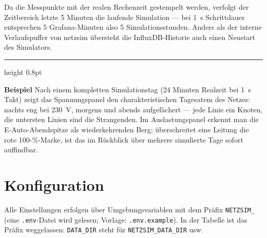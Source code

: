 \documentclass[11pt,a4paper,parskip=half]{scrreprt}
\newenvironment{beispiel}[1][Beispiel]
  {\par\medskip
   {\color{bsp}\hrule height 0.8pt}\nopagebreak\smallskip
   \noindent\textbf{\textsf{\textcolor{bsp}{#1}}}\quad\ignorespaces}
  {\par\nopagebreak\smallskip{\color{bsp}\hrule height 0.8pt}\par\medskip}
\begin{document}
Da die Messpunkte mit der realen Rechenzeit gestempelt werden,
verfolgt der Zeitbereich \glqq letzte 5 Minuten\grqq{} die laufende
Simulation --- bei 1~s Schrittdauer entsprechen 5 Grafana-Minuten
also 5 Simulationsstunden. Anders als der interne Verlaufspuffer von
netzsim übersteht die InfluxDB-Historie auch einen Neustart des
Simulators.

\begin{beispiel}
Nach einem kompletten Simulationstag (24 Minuten Realzeit bei 1~s
Takt) zeigt das Spannungspanel den charakteristischen
\glqq Tagesatem\grqq{} des Netzes: nachts eng bei 230~V, morgens
und abends aufgefächert --- jede Linie ein Knoten, die untersten
Linien sind die Strangenden. Im Auslastungspanel erkennt man die
E-Auto-Abendspitze als wiederkehrenden Berg; überschreitet eine
Leitung die rote 100-\%-Marke, ist das im Rückblick über mehrere
simulierte Tage sofort auffindbar.
\end{beispiel}

\chapter{Konfiguration}

Alle Einstellungen erfolgen über Umgebungsvariablen mit dem Präfix
\texttt{NETZSIM\_} (eine \texttt{.env}-Datei wird gelesen; Vorlage:
\texttt{.env.example}). In der Tabelle ist das Präfix weggelassen:
\texttt{DATA\_DIR} steht für \texttt{NETZSIM\_DATA\_DIR} usw.
\end{document}
